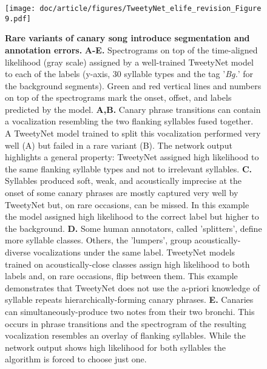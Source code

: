\documentclass[9pt,lineno]{elife}
\begin{document}
\begin{figure}[!ht] %
\texttt{[image: doc/article/figures/TweetyNet\_elife\_revision\_Figure 9.pdf]}
\caption{{\bf Rare variants of canary song introduce segmentation and annotation errors.}
{\bf A-E.} Spectrograms on top of the time-aligned likelihood (gray scale) assigned by a well-trained TweetyNet model to each of the labels (y-axis, 30 syllable types and the tag '\textit{Bg.}' for the background segments). Green and red vertical lines and numbers on top of the spectrograms mark the onset, offset, and labels predicted by the model. 
\textbf{A,B.} Canary phrase transitions can contain a vocalization resembling the two flanking syllables fused together. A TweetyNet model trained to split this vocalization performed very well (A) but failed in a rare variant (B). The network output highlights a general property: TweetyNet assigned high likelihood to the same flanking syllable types and not to irrelevant syllables.
\textbf{C.} Syllables produced soft, weak, and acoustically imprecise at the onset of some canary phrases are mostly captured very well by TweetyNet but, on rare occasions, can be missed. In this example the model assigned high likelihood to the correct label but higher to the background.
\textbf{D.} Some human annotators, called ’splitters’, define more syllable classes. Others, the ’lumpers’, group acoustically-diverse vocalizations under the same label. TweetyNet models trained on acoustically-close classes assign high likelihood to both labels and, on rare occasions, flip between them. This example demonstrates that TweetyNet does not use the a-priori knowledge of syllable repeats hierarchically-forming canary phrases.
\textbf{E.} Canaries can simultaneously-produce two notes from their two bronchi. This occurs in phrase transitions and the spectrogram of the resulting vocalization resembles an overlay of flanking syllables. While the network output shows high likelihood for both syllables the algorithm is forced to choose just one.}

\label{fig:errors_rare_variants}
\end{figure}
\end{document}
